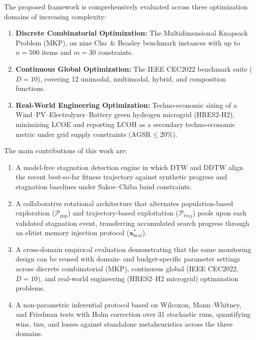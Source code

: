 \documentclass[review]{elsarticle}
\begin{document}
The proposed framework is comprehensively evaluated across three optimization domains of increasing complexity:
\begin{enumerate}
    \item \textbf{Discrete Combinatorial Optimization:} The Multidimensional Knapsack Problem (MKP), on nine Chu~\& Beasley benchmark instances with up to $n = 500$ items and $m = 30$ constraints.
    \item \textbf{Continuous Global Optimization:} The IEEE CEC2022 benchmark suite ($D = 10$), covering 12 unimodal, multimodal, hybrid, and composition functions.
    \item \textbf{Real-World Engineering Optimization:} Techno-economic sizing of a Wind--PV--Electrolyzer--Battery green hydrogen microgrid (HRES2-H2), minimizing LCOE and reporting LCOH as a secondary techno-economic metric under grid supply constraints ($\text{AGSR} \le 20\%$).
\end{enumerate}
The main contributions of this work are:
\begin{enumerate}
    \item A model-free stagnation detection engine in which DTW and DDTW
          align the recent best-so-far fitness trajectory against synthetic
          progress and stagnation baselines under Sakoe--Chiba band
          constraints.
    \item A collaborative rotational architecture that alternates
          population-based exploration ($\mathcal{P}_{pop}$) and
          trajectory-based exploitation ($\mathcal{P}_{traj}$) pools upon
          each validated stagnation event, transferring accumulated search
          progress through an elitist memory injection protocol
          ($\mathbf{x}_{best}^*$).
    \item A cross-domain empirical evaluation demonstrating that the same
          monitoring design can be reused with domain- and budget-specific parameter settings
          across discrete combinatorial (MKP), continuous global (IEEE
          CEC2022, $D=10$), and real-world engineering (HRES2--H2 microgrid)
          optimization problems.
    \item A non-parametric inferential protocol based on Wilcoxon,
      Mann--Whitney, and Friedman tests with Holm correction over
      31 stochastic runs, quantifying wins, ties, and losses against
      standalone metaheuristics across the three domains.
          
\end{enumerate}
\end{document}
